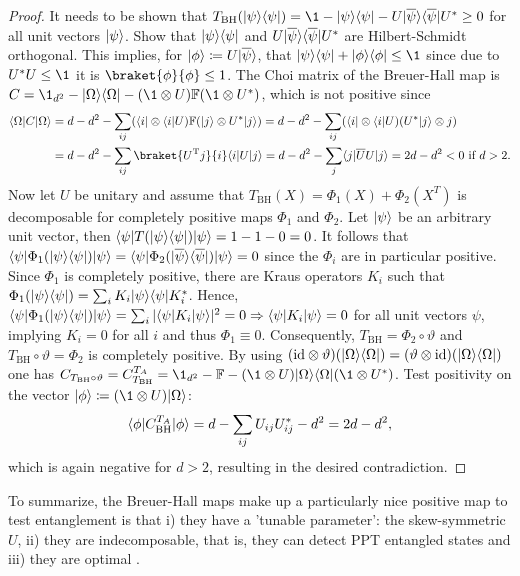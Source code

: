 \begin{proof}
    It needs to be shown that $T_\text{BH}(\pr \psi)=\1- \pr \psi - U\pr{\overline \psi}U^* \geq 0$ for all unit vectors $\lvert\psi\rangle$. Show that $\lvert\psi\rangle\langle\psi\rvert$ and $U\lvert\overline \psi\rangle\langle\overline \psi\rvert U^*$ are Hilbert-Schmidt orthogonal. This implies, for $\lvert\phi\rangle\coloneqq U\lvert\overline \psi\rangle$, that $\pr \psi + \pr \phi \leq \1$ since due to $U^*U \leq \1$ it is $\braket{\phi}{\phi} \leq 1$. The Choi matrix of the Breuer-Hall map is $C = \1_{d^2}-\pr \Omega - (\1 \otimes U)\mathbb F(\1 \otimes U^*)$, which is not positive since 
    \begin{align*}
        \bra \Omega C \ket \Omega &= d -d^2 - \sum_{ij}(\bra i \otimes \bra i U)\mathbb F (\ket j \otimes U^* \ket j) = d-d^2 - \sum_{ij}(\bra i \otimes \bra i U)(U^*\ket j \otimes j)\\
        &= d-d^2 -\sum_{ij}\braket{U^\text Tj}{i} \bra{i} U\ket{j}= d-d^2 -\sum_{j}\bra j \overline U U \ket j = 2d-d^2<0 \text{ if }d>2.
    \end{align*}
    Now let $U$ be unitary and assume that $T_\text{BH}(X) = \Phi_1(X)+\Phi_2(X^T)$ is decomposable for completely positive maps $\Phi_1$ and $\Phi_2$. Let $\lvert\psi\rangle$ be an arbitrary unit vector, then $\langle\psi\rvert T(\lvert\psi\rangle\langle\psi\rvert) \lvert\psi\rangle = 1-1-0 = 0$. It follows that $\langle\psi\rvert \Phi_1(\lvert\psi\rangle\langle\psi\rvert)\lvert\psi\rangle = \langle\psi\rvert \Phi_2(\lvert\overline \psi\rangle\langle\overline \psi\rvert)\lvert\psi\rangle=0$ since the $\Phi_i$ are in particular positive. Since $\Phi_1$ is completely positive, there are Kraus operators $K_i$ such that $\Phi_1(\lvert\psi\rangle\langle\psi\rvert) = \sum_i K_i\lvert\psi\rangle\langle\psi\rvert K_i^*$. Hence, $\langle\psi\rvert \Phi_1(\lvert\psi\rangle\langle\psi\rvert)\lvert\psi\rangle = \sum_i \vert \langle\psi\rvert K_i \lvert\psi\rangle\vert ^2 = 0 \Rightarrow \langle\psi\rvert K_i \lvert\psi\rangle = 0$ for all unit vectors $\psi$, implying $K_i = 0$ for all $i$ and thus $\Phi_1 \equiv 0$. Consequently, $T_\text{BH}=\Phi_2\circ \vartheta$ and $T_\text{BH}\circ \vartheta = \Phi_2$ is completely positive. By using $(\mathrm{id} \otimes \vartheta)(\lvert\Omega\rangle\langle\Omega\rvert) = (\vartheta\otimes \mathrm{id})(\lvert\Omega\rangle\langle\Omega\rvert)$ one has $C_{T_\text{BH}\circ\vartheta}=C_{T_\text{BH}}^{T_A} = \1_{d^2} - \mathbb F - (\1 \otimes U)\pr \Omega (\1 \otimes U^*)$. Test positivity on the vector $\ket{\phi}\coloneqq (\1 \otimes U)\ket \Omega$:
    \begin{align*}
        \langle\phi\rvert C_\text{BH}^{T_A}\lvert\phi\rangle = d- \sum_{ij}U_{ij}U_{ij}^*-d^2 = 2d-d^2,
    \end{align*}
    which is again negative for $d>2$, resulting in the desired contradiction.
\end{proof}
To summarize, the Breuer-Hall maps make up a particularly nice positive map to test entanglement is that i) they have a 'tunable parameter': the skew-symmetric $U$, ii) they are indecomposable, that is, they can detect PPT entangled states and iii) they are optimal \cite{hall2006constructions}.

